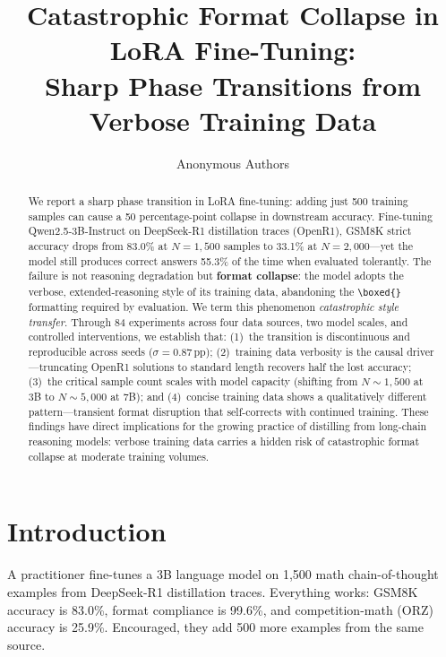 \documentclass{article}
\title{Catastrophic Format Collapse in LoRA Fine-Tuning:\\Sharp Phase Transitions from Verbose Training Data}
\author{
  Anonymous Authors
}
\begin{document}
\maketitle

\begin{abstract}
We report a sharp phase transition in LoRA fine-tuning: adding just 500 training samples can cause a 50 percentage-point collapse in downstream accuracy. Fine-tuning Qwen2.5-3B-Instruct on DeepSeek-R1 distillation traces (OpenR1), GSM8K strict accuracy drops from 83.0\% at $N{=}1{,}500$ samples to 33.1\% at $N{=}2{,}000$---yet the model still produces correct answers 55.3\% of the time when evaluated tolerantly. The failure is not reasoning degradation but \textbf{format collapse}: the model adopts the verbose, extended-reasoning style of its training data, abandoning the \texttt{\textbackslash boxed\{\}} formatting required by evaluation. We term this phenomenon \emph{catastrophic style transfer}. Through 84 experiments across four data sources, two model scales, and controlled interventions, we establish that: (1)~the transition is discontinuous and reproducible across seeds ($\sigma{=}0.87$\,pp); (2)~training data verbosity is the causal driver---truncating OpenR1 solutions to standard length recovers half the lost accuracy; (3)~the critical sample count scales with model capacity (shifting from $N{\sim}1{,}500$ at 3B to $N{\sim}5{,}000$ at 7B); and (4)~concise training data shows a qualitatively different pattern---transient format disruption that self-corrects with continued training. These findings have direct implications for the growing practice of distilling from long-chain reasoning models: verbose training data carries a hidden risk of catastrophic format collapse at moderate training volumes.
\end{abstract}

\section{Introduction}

A practitioner fine-tunes a 3B language model on 1,500 math chain-of-thought examples from DeepSeek-R1 distillation traces. Everything works: GSM8K accuracy is 83.0\%, format compliance is 99.6\%, and competition-math (ORZ) accuracy is 25.9\%. Encouraged, they add 500 more examples from the same source.
\end{document}
